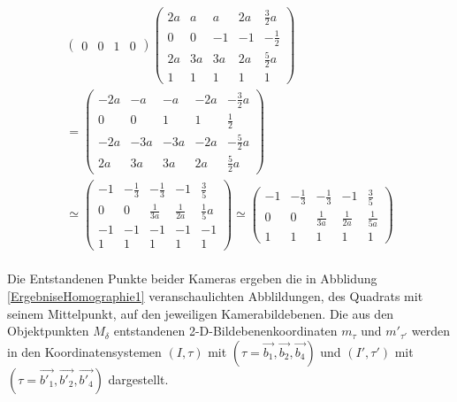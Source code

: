 \begin{gather}
\begin{pmatrix}
		0&0&1&0
	\end{pmatrix}
	\begin{pmatrix}
		2a&a&a&2a&\frac{3}{2}a\\
		0&0&-1&-1&-\frac{1}{2}\\
		2a&3a&3a&2a&\frac{5}{2}a\\
		1&1&1&1&1
	\end{pmatrix}\\=
	\begin{pmatrix}
		-2a&-a&-a&-2a&-\frac{3}{2}a\\
		0&0&1&1&\frac{1}{2}\\
		-2a&-3a&-3a&-2a&-\frac{5}{2}a\\
		2a&3a&3a&2a&\frac{5}{2}a
	\end{pmatrix}\\
	\simeq
	\begin{pmatrix}
		-1&-\frac{1}{3}&-\frac{1}{3}&-1&\frac{3}{5}\\
		0&0&\frac{1}{3a}&\frac{1}{2a}&\frac{1}{5}a\\
		-1&-1&-1&-1&-1\\
		1&1&1&1&1
	\end{pmatrix}
		\simeq
	\begin{pmatrix}
	-1&-\frac{1}{3}&-\frac{1}{3}&-1&\frac{3}{5}\\
	0&0&\frac{1}{3a}&\frac{1}{2a}&\frac{1}{5a}\\
	1&1&1&1&1
	\end{pmatrix}
\end{gather}\\

Die Entstandenen Punkte beider Kameras ergeben die in Abblidung \ref{ErgebniseHomographie1} veranschaulichten Abblildungen, des Quadrats mit seinem Mittelpunkt, auf den jeweiligen Kamerabildebenen. Die aus den Objektpunkten $M_\delta$ entstandenen 2-D-Bildebenenkoordinaten $m_\tau$ und $m'_{\tau'}$ werden in den Koordinatensystemen $(I,\tau)$ mit $(\tau = \vec{b_1},\vec{b_2},\vec{b_4})$ und $(I',\tau')$ mit $(\tau = \vec{b'_1},\vec{b'_2},\vec{b'_4})$ dargestellt.\\

